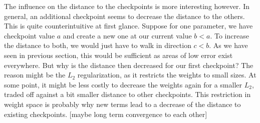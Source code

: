 The influence on the distance to the checkpoints is more interesting however. In
general, an additional checkpoint seems to decrease the distance to the others.
This is quite counterintuitive at first glance. Suppose for one parameter, we
have checkpoint value $a$ and create a new one at our current value $b<a$. To
increase the distance to both, we would just have to walk in direction $c<b$. As
we have seen in previous section, this would be sufficient as areas of low error
exist everywhere. But why is the distance then decreased for our first
checkpoint? The reason might be the $L_2$ regularization, as it restricts the
weights to small sizes. At some point, it might be less costly to decrease the
weights again for a smaller $L_2$, traded off against a bit smaller distance to
other checkpoints. This restriction in weight space is probably why new terms
lead to a decrease of the distance to existing checkpoints.
[maybe long term convergence to each other]

